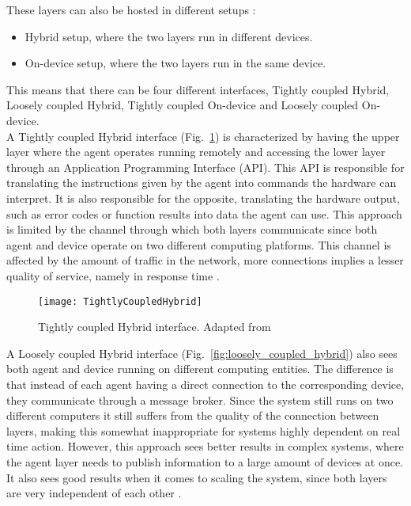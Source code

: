 These layers can also be hosted in different setups \cite{8591641}:
\begin{itemize}
	\item Hybrid setup, where the two layers run in different devices.
	\item On-device setup, where the two layers run in the same device. 
\end{itemize}

This means that there can be four different interfaces, Tightly coupled Hybrid, Loosely coupled Hybrid, Tightly coupled On-device and Loosely coupled On-device.\\

A Tightly coupled Hybrid interface (Fig.~\ref{fig:tightly_coupled_hybrid}) is characterized by having the upper layer where the agent operates running remotely and accessing the lower layer through an Application Programming Interface (API). This API is responsible for translating the instructions given by the agent into commands the hardware can interpret. It is also responsible for the opposite, translating the hardware output, such as error codes or function results into data the agent can use. This approach is limited by the channel through which both layers communicate since both agent and device operate on two different computing platforms. This channel is affected by the amount of traffic in the network, more connections implies a lesser quality of service, namely in response time \cite{8591641}.\\

\begin{figure}[hbt!]
	\centering
	\texttt{[image: TightlyCoupledHybrid]}
	\caption{Tightly coupled Hybrid interface. Adapted from \cite{8591641}}
	\label{fig:tightly_coupled_hybrid}
\end{figure}

A Loosely coupled Hybrid interface (Fig.~\ref{fig:loosely_coupled_hybrid}) also sees both agent and device running on different computing entities. The difference is that instead of each agent having a direct connection to the corresponding device, they communicate through a message broker. Since the system still runs on two different computers it still suffers from the quality of the connection between layers, making this somewhat inappropriate for systems highly dependent on real time action. However, this approach sees better results in complex systems, where the agent layer needs to publish information to a large amount of devices at once. It also sees good results when it comes to scaling the system, since both layers are very independent of each other \cite{8591641}.\\

